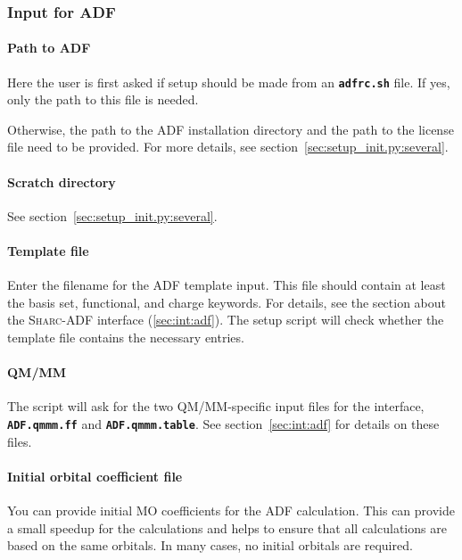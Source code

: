 \documentclass[a4paper,10pt,DIV=15,openany,twoside=false]{scrbook}
\newcommand{\sharc}{\textsc{Sharc}}
\newcommand{\ttt}[1]{\textbf{\texttt{#1}}}
\begin{document}
\subsubsection{Input for \textsc{ADF}}\label{sec:setup_init.py:adf}

\paragraph{Path to \textsc{ADF}}

Here the user is first asked if setup should be made from an \ttt{adfrc.sh} file. If yes, only the path to this file is needed.

Otherwise, the path to the ADF installation directory and the path to the license file need to be provided.
For more details, see section~\ref{sec:setup_init.py:several}.

\paragraph{Scratch directory}

See section~\ref{sec:setup_init.py:several}.

\paragraph{Template file}

Enter the filename for the \textsc{ADF} template input. This file should contain at least the basis set, functional, and charge keywords. For details, see the section about the \sharc-\textsc{ADF} interface (\ref{sec:int:adf}). The setup script will check whether the template file contains the necessary entries. 

\paragraph{QM/MM}

The script will ask for the two QM/MM-specific input files for the interface, \ttt{ADF.qmmm.ff} and \ttt{ADF.qmmm.table}.
See section~\ref{sec:int:adf} for details on these files.

\paragraph{Initial orbital coefficient file}

You can provide initial MO coefficients for the \textsc{ADF} calculation. This can provide a small speedup for the calculations and helps to ensure that all calculations are based on the same orbitals.
In many cases, no initial orbitals are required.
\end{document}
